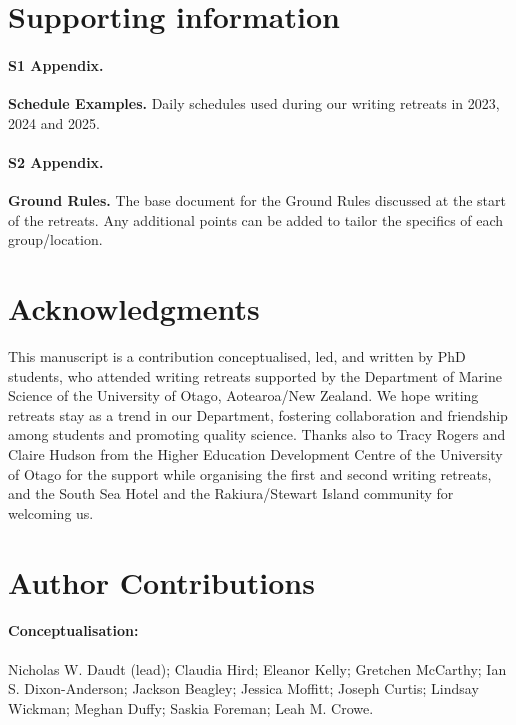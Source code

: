 \documentclass[10pt,letterpaper]{article}
\begin{document}
\section*{Supporting information}

\paragraph*{S1 Appendix.}
\label{S1_Appendix}
{\bf Schedule Examples.} Daily schedules used during our writing retreats in 2023, 2024 and 2025.

\paragraph*{S2 Appendix.}
\label{S2_Appendix}
{\bf Ground Rules.} The base document for the Ground Rules discussed at the start of the retreats. Any additional points can be added to tailor the specifics of each group/location.

\section*{Acknowledgments}
This manuscript is a contribution conceptualised, led, and written by PhD students, who attended writing retreats supported by the Department of Marine Science of the University of Otago, Aotearoa/New Zealand. We hope writing retreats stay as a trend in our Department, fostering collaboration and friendship among students and promoting quality science. Thanks also to Tracy Rogers and Claire Hudson from the Higher Education Development Centre of the University of Otago for the support while organising the first and second writing retreats, and the South Sea Hotel and the Rakiura/Stewart Island community for welcoming us. 

\section*{Author Contributions}

\paragraph*{Conceptualisation:} Nicholas W. Daudt (lead); Claudia Hird; Eleanor Kelly; Gretchen McCarthy; Ian S. Dixon-Anderson; Jackson Beagley; Jessica Moffitt; Joseph Curtis; Lindsay Wickman; Meghan Duffy; Saskia Foreman; Leah M. Crowe.
\end{document}
